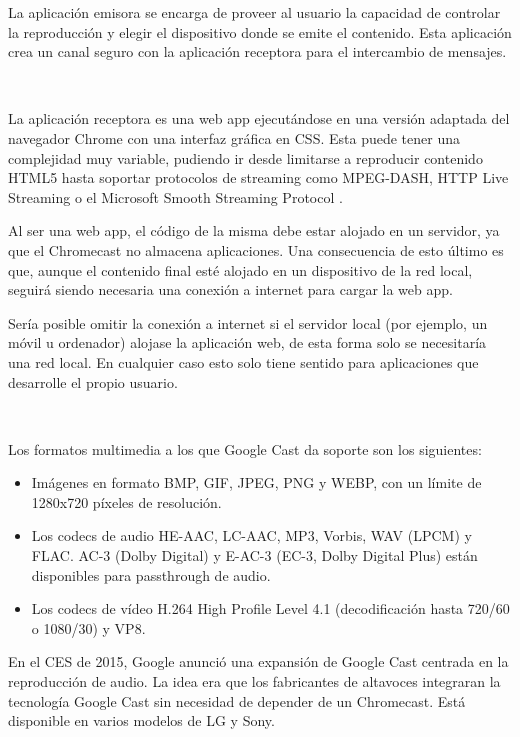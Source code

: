 La aplicación emisora se encarga de proveer al usuario la capacidad de controlar la reproducción y elegir el dispositivo donde se emite el contenido.
Esta aplicación crea un canal seguro con la aplicación receptora para el intercambio de mensajes.

\

La aplicación receptora es una web app ejecutándose en una versión adaptada del navegador Chrome con una interfaz gráfica en CSS.
Esta puede tener una complejidad muy variable, pudiendo ir desde limitarse a reproducir contenido HTML5 hasta soportar protocolos de streaming como MPEG-DASH, HTTP Live Streaming o el Microsoft Smooth Streaming Protocol \cite{CastSDK}.

Al ser una web app, el código de la misma debe estar alojado en un servidor, ya que el Chromecast no almacena aplicaciones.
Una consecuencia de esto último es que, aunque el contenido final esté alojado en un dispositivo de la red local, seguirá siendo necesaria una conexión a internet para cargar la web app.

Sería posible omitir la conexión a internet si el servidor local (por ejemplo, un móvil u ordenador) alojase la aplicación web, de esta forma solo se necesitaría una red local.
En cualquier caso esto solo tiene sentido para aplicaciones que desarrolle el propio usuario.

\

Los formatos multimedia a los que Google Cast da soporte son los siguientes:

\begin{itemize}

	\item Imágenes en formato BMP, GIF, JPEG, PNG y WEBP, con un límite de 1280x720 píxeles de resolución.

	\item Los codecs de audio HE-AAC, LC-AAC, MP3, Vorbis, WAV (LPCM) y FLAC. AC-3 (Dolby Digital) y E-AC-3 (EC-3, Dolby Digital Plus) están disponibles para passthrough de audio.

	\item Los codecs de vídeo H.264 High Profile Level 4.1 (decodificación hasta 720/60 o 1080/30) y VP8.

\end{itemize}

En el CES de 2015, Google anunció una expansión de Google Cast centrada en la reproducción de audio.
La idea era que los fabricantes de altavoces integraran la tecnología Google Cast sin necesidad de depender de un Chromecast.
Está disponible en varios modelos de LG y Sony.

